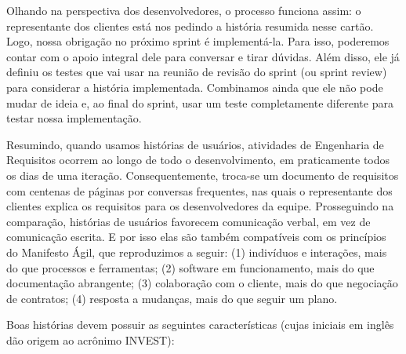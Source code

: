 \documentclass[
  11pt,
  twoside]{book}
\begin{document}
Olhando na perspectiva dos desenvolvedores, o processo funciona assim: o
representante dos clientes está nos pedindo a história resumida nesse
cartão. Logo, nossa obrigação no próximo sprint é implementá-la. Para
isso, poderemos contar com o apoio integral dele para conversar e tirar
dúvidas. Além disso, ele já definiu os testes que vai usar na reunião de
revisão do sprint (ou sprint review) para considerar a história
implementada. Combinamos ainda que ele não pode mudar de ideia e, ao
final do sprint, usar um teste completamente diferente para testar nossa
implementação.

Resumindo, quando usamos histórias de usuários, atividades de Engenharia
de Requisitos ocorrem ao longo de todo o desenvolvimento, em
praticamente todos os dias de uma iteração. Consequentemente, troca-se
um documento de requisitos com centenas de páginas por conversas
frequentes, nas quais o representante dos clientes explica os requisitos
para os desenvolvedores da equipe. Prosseguindo na comparação, histórias
de usuários favorecem comunicação verbal, em vez de comunicação escrita.
E por isso elas são também compatíveis com os princípios do Manifesto
Ágil, que reproduzimos a seguir: (1) indivíduos e interações, mais do
que processos e ferramentas; (2) software em funcionamento, mais do que
documentação abrangente; (3) colaboração com o cliente, mais do que
negociação de contratos; (4) resposta a mudanças, mais do que seguir um
plano.

 Boas histórias devem possuir
as seguintes características (cujas iniciais em inglês dão origem ao
acrônimo INVEST):
\end{document}
